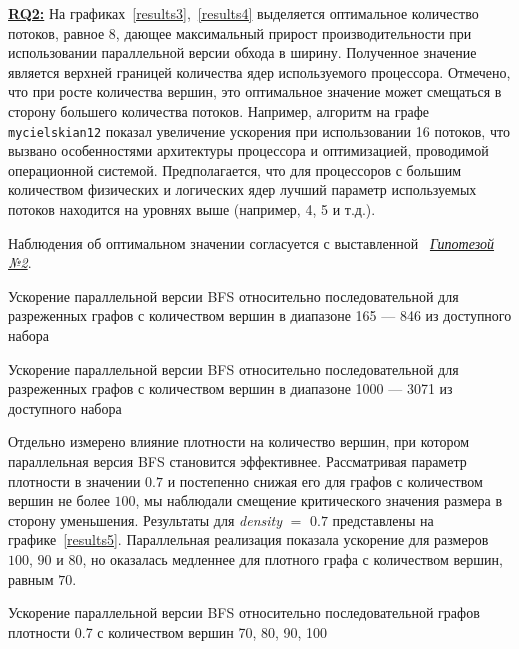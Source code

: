 \noindent\hyperref[rq2]{\textbf{RQ2:}}
На графиках~\ref{results3},~\ref{results4} выделяется оптимальное количество потоков, равное 8, дающее максимальный прирост производительности при использовании параллельной версии обхода в ширину. Полученное значение является верхней границей количества ядер используемого процессора. Отмечено, что при росте количества вершин, это оптимальное значение может смещаться в сторону большего количества потоков. Например, алгоритм на графе \texttt{mycielskian12} показал увеличение ускорения при использовании 16 потоков, что вызвано особенностями архитектуры процессора и оптимизацией, проводимой операционной системой. Предполагается, что для процессоров с большим количеством физических и логических ядер лучший параметр используемых потоков находится на уровнях выше (например, 4, 5 и т.д.). 

Наблюдения об оптимальном значении согласуется с выставленной ~\hyperref[t2]{\textit{Гипотезой №2}}.
\newline

\begin{table}
  \centering

\caption{Ускорение параллельной версии BFS относительно последовательной для разреженных графов с количеством вершин в диапазоне 165 --- 846 из доступного набора}
\label{results3}
\end{table}

\begin{table}
  \centering

\caption{Ускорение параллельной версии BFS относительно последовательной для разреженных графов с количеством вершин в диапазоне 1000 --- 3071 из доступного набора}
\label{results4}
\end{table}

Отдельно измерено влияние плотности на количество вершин, при котором параллельная версия BFS становится эффективнее. Рассматривая параметр плотности в значении $0.7$ и постепенно снижая его для графов с количеством вершин не более $100$, мы наблюдали смещение критического значения размера в сторону уменьшения. Результаты для \textit{density} $=$ $0.7$ представлены на графике~\ref{results5}. Параллельная реализация показала ускорение для размеров $100$, $90$ и $80$, но оказалась медленнее для плотного графа с количеством вершин, равным $70$.

\begin{table}
  \centering

\caption{Ускорение параллельной версии BFS относительно последовательной графов плотности 0.7 с количеством вершин 70, 80, 90, 100}
\label{results5}
\end{table}

